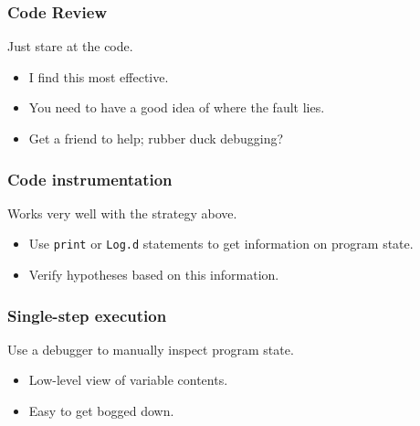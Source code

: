 \begin{frame}
\frametitle{Code Review}

\begin{changemargin}{1cm}
\Large

Just stare at the code.\\[1em]

\begin{itemize}
\item I find this most effective.
\item You need to have a good idea of where the fault lies.
\item Get a friend to help; rubber duck debugging?
\end{itemize}

\end{changemargin}

\end{frame}

\begin{frame}
\frametitle{Code instrumentation}

\begin{changemargin}{1cm}
\Large

Works very well with the strategy above.

\begin{itemize}
\item Use {\tt print} or {\tt Log.d} statements to get
information on program state.
\item Verify hypotheses based on this information.
\end{itemize}

\end{changemargin}

\end{frame}

\begin{frame}
\frametitle{Single-step execution}

\begin{changemargin}{1cm}
\Large

Use a debugger to manually inspect program state.

\begin{itemize}
\item Low-level view of variable contents.
\item Easy to get bogged down.
\end{itemize}

\end{changemargin}

\end{frame}

